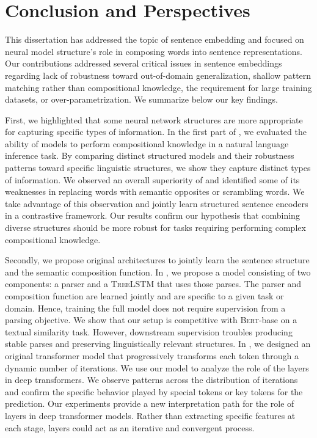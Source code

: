 \setchapterpreamble[u]{\margintoc}
\chapter{Conclusion and Perspectives}


This dissertation has addressed the topic of sentence embedding and focused on neural model structure's role in composing words into sentence representations. Our contributions addressed several critical issues in sentence embeddings regarding lack of robustness toward out-of-domain generalization, shallow pattern matching rather than compositional knowledge, the requirement for large training datasets, or over-parametrization. We summarize below our key findings.

First, we highlighted that some neural network structures are more appropriate for capturing specific types of information. In the first part of , we evaluated the ability of models to perform compositional knowledge in a natural language inference task. By comparing distinct structured models and their robustness patterns toward specific linguistic structures, we show they capture distinct types of information. We observed an overall superiority of \bert and identified some of its weaknesses in replacing words with semantic opposites or scrambling words. We take advantage of this observation and jointly learn structured sentence encoders in a contrastive framework. Our results confirm our hypothesis that combining diverse structures should be more robust for tasks requiring performing complex compositional knowledge.

Secondly, we propose original architectures to jointly learn the sentence structure and the semantic composition function. In , we propose a model consisting of two components: a parser and a \textsc{TreeLSTM} that uses those parses. The parser and composition function are learned jointly and are specific to a given task or domain. Hence, training the full model does not require supervision from a parsing objective. We show that our setup is competitive with \textsc{Bert}-base on a textual similarity task. However, downstream supervision troubles producing stable parses and preserving linguistically relevant structures. In , we designed an original transformer model that progressively transforms each token through a dynamic number of iterations. We use our model to analyze the role of the layers in deep transformers. We observe patterns across the distribution of iterations and confirm the specific behavior played by special tokens or key tokens for the prediction. Our experiments provide a new interpretation path for the role of layers in deep transformer models. Rather than extracting specific features at each stage, layers could act as an iterative and convergent process.

